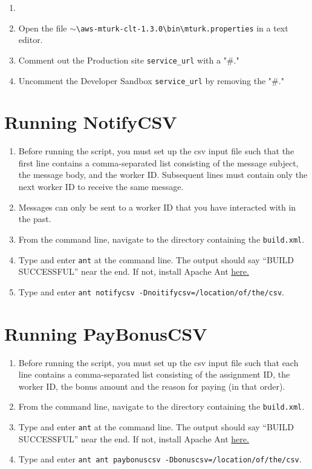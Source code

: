 \documentclass[10pt]{article}
\begin{document}
\begin{enumerate}
	\item \item Open the file $\sim$\verb+\aws-mturk-clt-1.3.0\bin\mturk.properties+ in a text editor.
	\item Comment out the Production site \verb+service_url+ with a "\#."
	\item Uncomment the Developer Sandbox \verb+service_url+ by removing the "\#."
\end{enumerate}

\section*{Running NotifyCSV}

\begin{enumerate}
	\item Before running the script, you must set up the csv input file such that the first line contains a comma-separated list consisting of the message subject, the message body, and the worker ID. Subsequent lines must contain only the next worker ID to receive the same message. 
	\item Messages can only be sent to a worker ID that you have interacted with in the past.
	\item From the command line, navigate to the directory containing the \verb+build.xml+. 
	\item Type and enter \verb+ant+ at the command line. The output should say ``BUILD SUCCESSFUL'' near the end. If not, install Apache Ant \href{http://ant.apache.org/}{here.}
	\item Type and enter \verb+ant notifycsv -Dnoitifycsv=/location/of/the/csv+.
\end{enumerate}

\section*{Running PayBonusCSV}

\begin{enumerate}
	\item Before running the script, you must set up the csv input file such that each line contains a comma-separated list consisting of the assignment ID, the worker ID, the bonus amount and the reason for paying (in that order). 
	\item From the command line, navigate to the directory containing the \verb+build.xml+. 
	\item Type and enter \verb+ant+ at the command line. The output should say ``BUILD SUCCESSFUL'' near the end. If not, install Apache Ant \href{http://ant.apache.org/}{here.}
	\item Type and enter \verb+ant ant paybonuscsv -Dbonuscsv=/location/of/the/csv+.
\end{enumerate}
\end{document}

